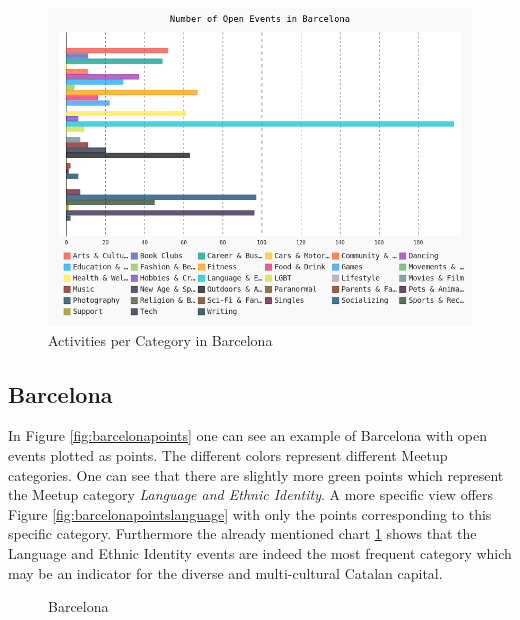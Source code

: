 \begin{figure}[!htp]
	\includegraphics[width=1\linewidth]{../plotting/pngs/categories/Barcelona.png}
	\caption{Activities per Category in Barcelona}\label{fig:barcelonabar}	
\end{figure}

\subsection*{Barcelona}

In Figure \ref{fig:barcelonapoints} one can see an example of Barcelona with open events plotted as points. The different colors represent different Meetup categories. One can see that there are slightly more green points which represent the Meetup category \emph{Language and Ethnic Identity}. A more specific view offers Figure \ref{fig:barcelonapointslanguage} with only the points corresponding to this specific category. Furthermore the already mentioned chart \ref{fig:barcelonabar} shows that the Language and Ethnic Identity events are indeed the most frequent category which may be an indicator for the diverse and multi-cultural Catalan capital. 

\begin{figure}[!htp]
	\hfill
	\caption{Barcelona}\label{fig:barcelonamap}
\end{figure}

